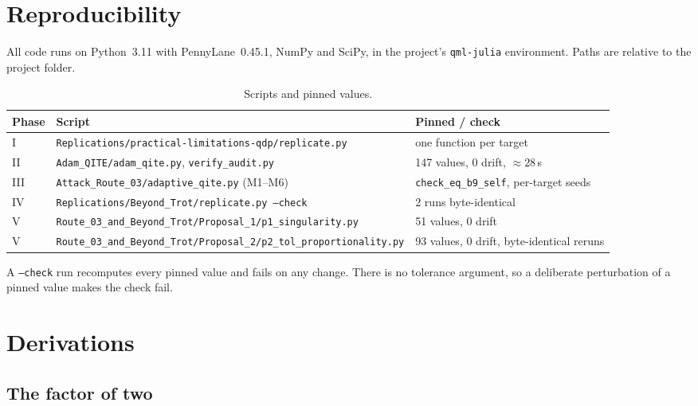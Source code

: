 \documentclass[aps,pra,reprint,superscriptaddress,nofootinbib]{revtex4-2}
\begin{document}
\appendix

\section{Reproducibility}
\label{app:repro}

All code runs on Python~3.11 with PennyLane~0.45.1, NumPy and SciPy, in the project's
\texttt{qml-julia} environment. Paths are relative to the project folder.

\begin{table}[t]
\caption{Scripts and pinned values.}
\label{tab:scripts}
\begin{ruledtabular}
\begin{tabular}{lp{10.2cm}p{4.6cm}}
Phase & Script & Pinned / check \\
\midrule
I   & \texttt{Replications/practical-limitations-qdp/replicate.py} & one function per target \\
II  & \texttt{Adam\_QITE/adam\_qite.py}, \texttt{verify\_audit.py} & 147 values, 0 drift, ${\approx}28$\,s \\
III & \texttt{Attack\_Route\_03/adaptive\_qite.py} (M1--M6) & \texttt{check\_eq\_b9\_self}, per-target seeds \\
IV  & \texttt{Replications/Beyond\_Trot/replicate.py --check} & 2 runs byte-identical \\
V   & \texttt{Route\_03\_and\_Beyond\_Trot/Proposal\_1/p1\_singularity.py} & 51 values, 0 drift \\
V   & \texttt{Route\_03\_and\_Beyond\_Trot/Proposal\_2/p2\_tol\_proportionality.py} & 93 values, 0 drift, byte-identical reruns \\
\end{tabular}
\end{ruledtabular}
\end{table}

A \texttt{--check} run recomputes every pinned value and fails on any change. There is no
tolerance argument, so a deliberate perturbation of a pinned value makes the check fail.

\section{Derivations}
\label{app:derivations}

\subsection{The factor of two}
\label{app:factor2}
\end{document}
